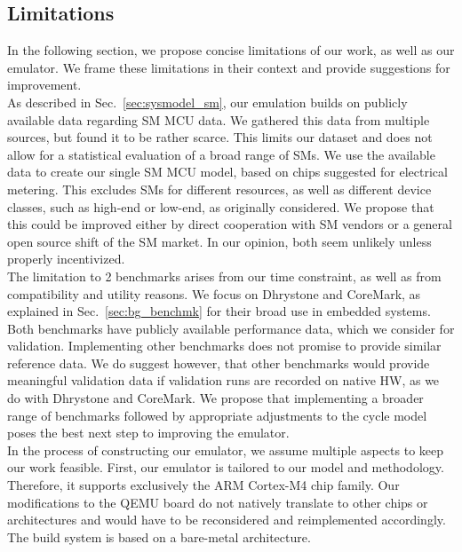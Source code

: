 \documentclass[english]{tudscrartcl}
\begin{document}
		\subsection{Limitations}
			\label{sec:eval_limits}
			In the following section, we propose concise limitations of our work, as well as our emulator.
			We frame these limitations in their context and provide suggestions for improvement.
			\\
			As described in Sec.~\ref{sec:sysmodel_sm}, our emulation builds on publicly available data regarding \ac{SM} \ac{MCU} data.
			We gathered this data from multiple sources, but found it to be rather scarce.
			This limits our dataset and does not allow for a statistical evaluation of a broad range of \acp{SM}.
			We use the available data to create our single \ac{SM} \ac{MCU} model, based on chips suggested for electrical metering.
			This excludes \acp{SM} for different resources, as well as different device classes, such as high-end or low-end, as originally considered.
			We propose that this could be improved either by direct cooperation with \ac{SM} vendors or a general open source shift of the \ac{SM} market.
			In our opinion, both seem unlikely unless properly incentivized.
			\\
			The limitation to 2 benchmarks arises from our time constraint, as well as from compatibility and utility reasons.
			We focus on Dhrystone and CoreMark, as explained in Sec.~\ref{sec:bg_benchmk} for their broad use in embedded systems.
			Both benchmarks have publicly available performance data, which we consider for validation.
			Implementing other benchmarks does not promise to provide similar reference data.
			We do suggest however, that other benchmarks would provide meaningful validation data if validation runs are recorded on native \ac{HW}, as we do with Dhrystone and CoreMark.
			We propose that implementing a broader range of benchmarks followed by appropriate adjustments to the cycle model poses the best next step to improving the emulator.
			\\
			In the process of constructing our emulator, we assume multiple aspects to keep our work feasible.
			First, our emulator is tailored to our model and methodology.
			\\
			Therefore, it supports exclusively the ARM Cortex-M4 chip family.
			Our modifications to the QEMU board do not natively translate to other chips or architectures and would have to be reconsidered and reimplemented accordingly.
			\\
			The build system is based on a bare-metal architecture.
\end{document}
